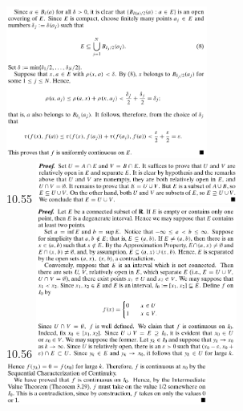 \documentclass[8pt,landscape]{article}
\begin{document}
\begin{multicols}{3}
    \includegraphics[width=250]{10_52b.png} \\
    10.55
    \includegraphics[width=250]{10_55.png} \\
    10.56
    \includegraphics[width=250]{10_56a.png} \\
    \includegraphics[width=250]{10_56b.png} \\

\end{multicols}
\end{document}
